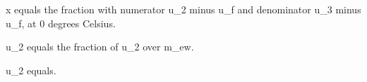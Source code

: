 x equals the fraction with numerator u_2 minus u_f and denominator u_3 minus u_f, at 0 degrees Celsius.

u_2 equals the fraction of u_2 over m_ew.

u_2 equals.